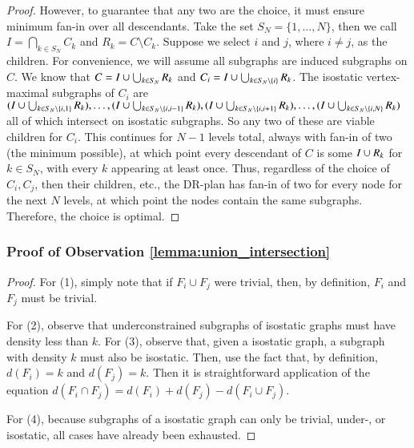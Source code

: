 \begin{proof}
However, to guarantee that any two are the  choice, it must ensure minimum fan-in over all descendants. Take the set $S_N=\{1,\dots,N\}$, then we call $I=\bigcap_{k\in S_N}{C_k}$ and $R_k=C\setminus C_k$. Suppose we select $i$ and $j$, where $i\neq j$, as the children. For convenience, we will assume all subgraphs are induced subgraphs on $C$. We know that $C=I\cup\bigcup_{k\in S_N}{R_k}$ and $C_i=I\cup\bigcup_{k\in S_N\setminus\{i\}}{R_k}$. The isostatic vertex-maximal subgraphs of $C_i$ are $(I\cup\bigcup_{k\in S_N\setminus\{i,1\}}{R_k}),\ldots,(I\cup\bigcup_{k\in S_N\setminus\{i,i-1\}}{R_k}),(I\cup\bigcup_{k\in S_N\setminus\{i,i+1\}}{R_k}),\ldots,(I\cup\bigcup_{k\in S_N\setminus\{i,N\}}{R_k})$ all of which intersect on isostatic subgraphs. So any two of these are viable children for $C_i$.
This continues for $N-1$ levels total, always with fan-in of two (the minimum possible), at which point every descendant of $C$ is some $I\cup R_k$ for $k\in S_N$, with every $k$ appearing at least once. Thus, regardless of the choice of $C_i,C_j$, then their children, etc., the DR-plan has fan-in of two for every node for the next $N$ levels, at which point the nodes contain the same subgraphs. Therefore, the choice is optimal.
%
%
\end{proof}


\subsubsection{Proof of Observation \ref{lemma:union_intersection}}

\begin{proof}
For (1), simply note that if $F_i\cup F_j$ were trivial, then, by definition, $F_i$ and $F_j$ must be trivial.

For (2), observe that underconstrained subgraphs of isostatic graphs must have density less than $k$. For (3), observe that, given a isostatic graph, a subgraph with density $k$ must also be isostatic. Then, use the fact that, by definition, $d(F_i)=k$ and $d(F_j)=k$. Then it is straightforward application of the equation $d(F_i\cap F_j)=d(F_i)+d(F_j)-d(F_i\cup F_j)$.

For (4), because subgraphs of a isostatic graph can only be trivial, under-, or isostatic, all cases have already been exhausted.
\end{proof}


